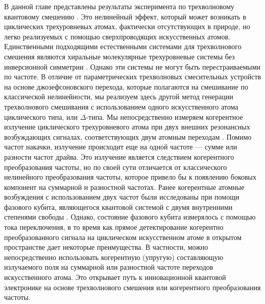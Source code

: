 В данной главе представлены результаты эксперимента по трехволновому квантовому смешению \cite{liu2014controllable}. Это нелинейный эффект, который может возникать в циклических трехуровневых атомах, фактически отсутствующих в природе, но легко реализуемых с помощью сверхпроводящих искусственных атомов. Единственными подходящими естественными системами для трехволнового смешения являются хиральные молекулярные трехуровневые системы без инверсионной симметрии \cite{PhysRevLett.111.023008}. Однако эти системы не могут быть перестраиваемыми по частоте. В отличие от параметрических трехволновых смесительных устройств на основе джозефсоновского перехода, которые полагаются на смешивание по классической нелинейности, мы реализуем здесь другой метод генерации трехволнового смешивания с использованием одного искусственного атома циклического типа, или $\Delta$-типа. Мы непосредственно измеряем когерентное излучение циклического трехуровневого атома при двух внешних резонансных возбуждающих сигналах, соответствующих двум атомным переходам \cite{PhysRevA.98.041801}. Помимо частот накачки, излучение происходит еще на одной частоте --- сумме или разности частот драйва. Это излучение является следствием когерентного преобразования частоты, но по своей сути отличается от классического нелинейного преобразования частоты, которое привело бы к появлению боковых компонент на суммарной и разностной частотах. Ранее когерентные атомные возбуждения с использованием двух частот были исследованы при помощи фазового кубита, являющегося квантовой системой с двумя внутренними степенями свободы \cite{Lecocq2012}. Однако, состояние фазового кубита измерялось с помощью тока переключения, в то время как прямое детектирование когерентно преобразованного сигнала на циклическом искусственном атоме в открытом пространстве дает некоторые преимущества. В частности, можно непосредственно использовать когерентную (упругую) составляющую излучаемого поля на суммарной или разностной частоте переходов искусственного атома. Это открывает путь к инновационной квантовой электронике на основе трехволнового смешения или когерентного преобразования частоты.
